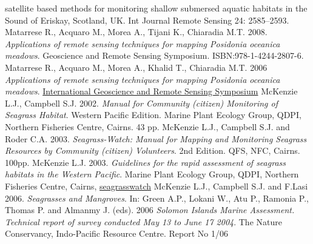 \documentclass[11pt]{article}
\begin{document}
\begin{thebibliography}{999}
{satellite based methods for monitoring shallow submersed aquatic habitats in the Sound of Eriskay, Scotland, UK}. Int Journal Remote Sensing 24: 2585–2593. \pageref{Malthus03}
Matarrese R., Acquaro M., Morea A., Tijani K., Chiaradia M.T. 2008. \emph{Applications of remote sensing techniques for mapping \textit{{Posidonia oceanica}} meadows}. Geoscience and Remote Sensing Symposium. ISBN:978-1-4244-2807-6. \pageref{Matarrese08}
Matarrese R., Acquaro M., Morea A., Khalid T., Chiaradia M.T. 2006 \emph{Applications of remote sensing techniques for mapping \textit{{Posidonia oceanica}} meadows}.
\href{http://www.igarss08.org/Abstracts/pdfs/3888.pdf}{International Geoscience and Remote Sensing Symposium} \pageref{Matarrese06}
McKenzie L.J., Campbell S.J. 2002. \emph{Manual for Community (citizen) Monitoring of
Seagrass Habitat}. Western Pacific Edition. Marine Plant Ecology Group, QDPI, Northern Fisheries Centre, Cairns. 43 pp. \pageref{McKenzie02}
McKenzie L.J., Campbell S.J. and Roder C.A. 2003. \emph{Seagrass-Watch: Manual for Mapping and Monitoring Seagrass Resources by Community (citizen) Volunteers}. 2nd Edition. QFS, NFC, Cairns. 100pp. \pageref{McKenzie03}
McKenzie L.J. 2003. \emph{Guidelines for the rapid assessment of seagrass habitats in the
Western Pacific}. Marine Plant Ecology Group, QDPI, Northern Fisheries Centre, Cairns, \href{http://www.seagrasswatch.org}{seagrasswatch} \pageref{McKenzieetal03}
McKenzie L.J., Campbell S.J. and F.Lasi 2006. \emph{Seagrasses and Mangroves}. In: Green A.P., Lokani W., Atu P., Ramonia P., Thomas P. and Almanmy J. (eds). 2006 \emph{Solomon Islands Marine Assessment. Technical report of survey conducted May 13 to June 17 2004}. The Nature Conservancy, Indo-Pacific Resource Centre. Report No 1/06 \pageref{McKenzie06}

\end{thebibliography}
\end{document}
